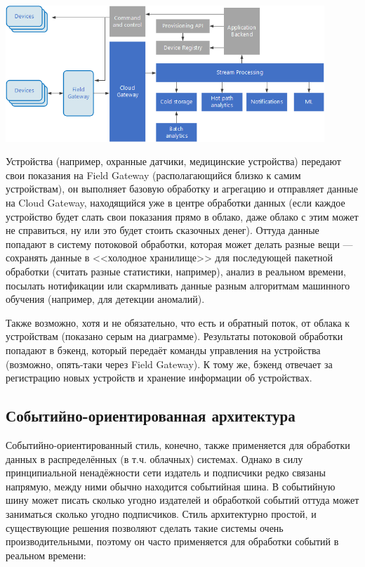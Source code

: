 \documentclass{../../text-style}
\begin{document}
\begin{center}
    \includegraphics[width=0.9\textwidth]{iot.png}
\end{center}

Устройства (например, охранные датчики, медицинские устройства) передают свои показания на Field Gateway (располагающийся близко к самим устройствам), он выполняет базовую обработку и агрегацию и отправляет данные на Cloud Gateway, находящийся уже в центре обработки данных (если каждое устройство будет слать свои показания прямо в облако, даже облако с этим может не справиться, ну или это будет стоить сказочных денег). Оттуда данные попадают в систему потоковой обработки, которая может делать разные вещи --- сохранять данные в <<холодное хранилище>> для последующей пакетной обработки (считать разные статистики, например), анализ в реальном времени, посылать нотификации или скармливать данные разным алгоритмам машинного обучения (например, для детекции аномалий).

Также возможно, хотя и не обязательно, что есть и обратный поток, от облака к устройствам (показано серым на диаграмме). Результаты потоковой обработки попадают в бэкенд, который передаёт команды управления на устройства (возможно, опять-таки через Field Gateway). К тому же, бэкенд отвечает за регистрацию новых устройств и хранение информации об устройствах.

\subsection{Событийно-ориентированная архитектура}

Событийно-ориентированный стиль, конечно, также применяется для обработки данных в распределённых (в т.ч. облачных) системах. Однако в силу принципиальной ненадёжности сети издатель и подписчики редко связаны напрямую, между ними обычно находится событийная шина. В событийную шину может писать сколько угодно издателей и обработкой событий оттуда может заниматься сколько угодно подписчиков. Стиль архитектурно простой, и существующие решения позволяют сделать такие системы очень производительными, поэтому он часто применяется для обработки событий в реальном времени:
\end{document}
